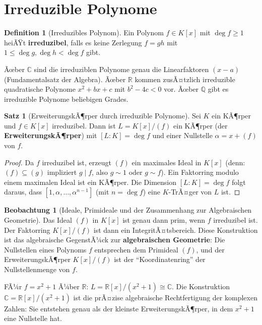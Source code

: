﻿\documentclass[a4paper,12pt]{report}
\theoremstyle{definition}
\newtheorem{definition}{Definition}
\newtheorem{satz}{Satz}
\newtheorem{beobachtung}{Beobachtung}
\begin{document}
\section{Irreduzible Polynome}

\begin{definition}[Irreduzibles Polynom]
    Ein Polynom $f \in K[x]$ mit $\deg f \geq 1$ heiÃŸt \textbf{irreduzibel},
    falls es keine Zerlegung $f = gh$ mit $1 \leq \deg g, \deg h < \deg f$ gibt.

    Ãœber $\mathbb{C}$ sind die irreduziblen Polynome genau die Linearfaktoren
    $(x - a)$ (Fundamentalsatz der Algebra). Ãœber $\mathbb{R}$ kommen
    zusÃ¤tzlich irreduzible quadratische Polynome $x^2 + bx + c$ mit
    $b^2 - 4c < 0$ vor. Ãœber $\mathbb{Q}$ gibt es irreduzible Polynome
    beliebigen Grades.
\end{definition}

\begin{satz}[ErweiterungskÃ¶rper durch irreduzible Polynome]
    Sei $K$ ein KÃ¶rper und $f \in K[x]$ irreduzibel. Dann ist
    $L = K[x]/(f)$ ein KÃ¶rper (der \textbf{ErweiterungskÃ¶rper})
    mit $[L : K] = \deg f$ und einer Nullstelle $\alpha = x + (f)$ von $f$.
\end{satz}
\begin{proof}
    Da $f$ irreduzibel ist, erzeugt $(f)$ ein maximales Ideal in $K[x]$
    (denn: $(f) \subseteq (g)$ impliziert $g \mid f$, also $g \sim 1$ oder $g \sim f$).
    Ein Faktorring modulo einem maximalen Ideal ist ein KÃ¶rper.
    Die Dimension $[L:K] = \deg f$ folgt daraus, dass $[1, \alpha, \ldots, \alpha^{n-1}]$
    (mit $n = \deg f$) eine $K$-TrÃ¤ger von $L$ ist.
\end{proof}

\begin{beobachtung}[Ideale, Primideale und der Zusammenhang zur Algebraischen Geometrie]
    Das Ideal $(f)$ in $K[x]$ ist genau dann prim, wenn $f$ irreduzibel ist.
    Der Faktorring $K[x]/(f)$ ist dann ein IntegritÃ¤tsbereich.
    Diese Konstruktion ist das algebraische GegenstÃ¼ck zur
    \textbf{algebraischen Geometrie}: Die Nullstellen eines Polynoms $f$
    entsprechen dem Primideal $(f)$, und der ErweiterungskÃ¶rper $K[x]/(f)$
    ist der ``Koordinatenring'' der Nullstellenmenge von $f$.

    FÃ¼r $f = x^2 + 1$ Ã¼ber $\mathbb{R}$: $L = \mathbb{R}[x]/(x^2+1) \cong \mathbb{C}$.
    Die Konstruktion $\mathbb{C} = \mathbb{R}[x]/(x^2+1)$ ist die prÃ¤zise
    algebraische Rechtfertigung der komplexen Zahlen: Sie entstehen genau
    als der kleinste ErweiterungskÃ¶rper, in dem $x^2 + 1$ eine Nullstelle hat.
\end{beobachtung}
\end{document}
